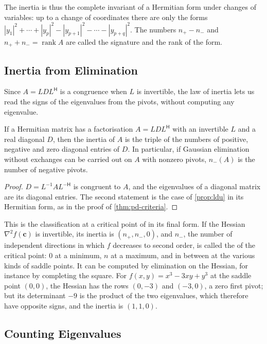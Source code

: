 The inertia is thus the complete invariant of a Hermitian form under changes of variables: up to a change of coordinates there are only the forms $|y_1|^2+\cdots+|y_p|^2-|y_{p+1}|^2-\cdots-|y_{p+q}|^2$. The numbers $n_+-n_-$ and $n_++n_-=\operatorname{rank}A$ are called the signature and the rank of the form.

\subsection{Inertia from Elimination}

Since $A=LDL^{\mathsf H}$ is a congruence when $L$ is invertible, the law of inertia lets us read the signs of the eigenvalues from the pivots, without computing any eigenvalue.

\begin{proposition}
\label{prop:inertia-ldl}
If a Hermitian matrix has a factorisation $A=LDL^{\mathsf H}$ with an invertible $L$ and a real diagonal $D$, then the inertia of $A$ is the triple of the numbers of positive, negative and zero diagonal entries of $D$. In particular, if Gaussian elimination without exchanges can be carried out on $A$ with nonzero pivots, $n_-(A)$ is the number of negative pivots.
\end{proposition}

\begin{proof}
$D=L^{-1}AL^{-\mathsf H}$ is congruent to $A$, and the eigenvalues of a diagonal matrix are its diagonal entries. The second statement is the case of \cref{prop:ldu} in its Hermitian form, as in the proof of \cref{thm:pd-criteria}.
\end{proof}

This is the classification at a critical point of  in its final form. If the Hessian $\nabla^2f(\mathbf c)$ is invertible, its inertia is $(n_+,n_-,0)$, and $n_-$, the number of independent directions in which $f$ decreases to second order, is called the  of the critical point: $0$ at a minimum, $n$ at a maximum, and in between at the various kinds of saddle points. It can be computed by elimination on the Hessian, for instance by completing the square. For $f(x,y)=x^3-3xy+y^3$ at the saddle point $(0,0)$, the Hessian has the rows $(0,-3)$ and $(-3,0)$, a zero first pivot; but its determinant $-9$ is the product of the two eigenvalues, which therefore have opposite signs, and the inertia is $(1,1,0)$.

\subsection{Counting Eigenvalues}

